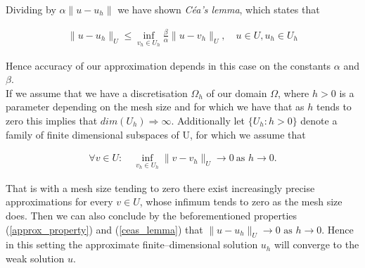 \documentclass[../draft_1.tex]{subfiles}
\begin{document}
Dividing by $\alpha \| u - u_h \| $ we have shown \textit{C\'{e}a's lemma}, which states that
\begin{ceqn}
\begin{equation}
\begin{aligned}
\label{ceas_lemma}
\| u - u_h \|_U \leq \inf_{v_h \in U_h} \frac{\beta}{\alpha} \| u - v_h \|_U, \quad u \in U, u_h \in U_h
\end{aligned}
\end{equation}
\end{ceqn}
Hence accuracy of our approximation depends in this case on the constants $\alpha$ and $\beta$. 
\bigskip
\\ 
If we assume that we have a discretisation $\Omega_h$ of our domain $\Omega$, where $h > 0$ is a parameter depending on the mesh size and for which we have that as $h$ tends to zero this implies that $dim(U_h) \Rightarrow \infty$. Additionally let $\{U_h : h > 0\}$ denote a family of finite dimensional subspaces of U, for which we assume that
\begin{ceqn}
\begin{equation}
\begin{aligned}
\forall v \in U : \quad \inf_{v_h \in U_h} \| v - v_h\|_U \rightarrow 0 \ \text{as } h \rightarrow 0.
\end{aligned}
\end{equation}
\end{ceqn}
That is with a mesh size tending to zero there exist increasingly precise approximations for every $v \in U$, whose infimum tends to zero as the mesh size does. Then we can also conclude by the beforementioned properties (\ref{approx_property}) and (\ref{ceas_lemma}) that $\| u - u_h\|_U \rightarrow 0 \text{ as } h \rightarrow 0$. Hence in this setting the approximate finite--dimensional solution $u_h$ will converge to the weak solution $u$. 
\end{document}
